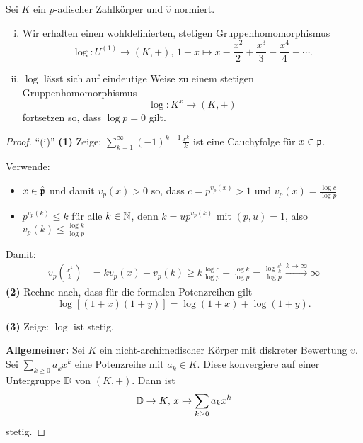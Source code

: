 \begin{Prop}
Sei $K$ ein $p$-adischer Zahlkörper und $\hat{v}$ normiert.
\begin{enumerate}[(i)]
\item Wir erhalten einen wohldefinierten, stetigen Gruppenhomomorphismus
\[ \log \colon U^{(1)} \to (K,+) , \, 1+x \mapsto x - \frac{x^2}{2} + \frac{x^3}{3} - \frac{x^4}{4} + \cdots .
\]
\item $\log$ lässt sich auf eindeutige Weise zu einem stetigen Gruppenhomomorphismus
\[ \log \colon K^x \to (K,+)
\]
fortsetzen so, dass $\log p = 0$ gilt.
\end{enumerate}
\end{Prop}


\begin{proof}
\enquote{(i)} \textbf{(1)} Zeige: $\sum_{k=1}^{\infty} (-1)^{k-1} \frac{x^k}{k}$ ist eine Cauchyfolge für $x\in\mathfrak{p}$.

\bigskip Verwende:
\begin{itemize}
\item $x \in \hat{\mathfrak{p}}$ und damit $v_p(x)>0$ so, dass $c= p^{v_p(x)} >1$ und $v_p(x) = \frac{\log c}{\log p}$
\item $p^{v_p(k)} \leq k$ für alle $k \in \mathbb{N}$, denn $k = u p^{v_p(k)}$ mit $(p,u) = 1$, also
	$v_p(k) \leq \frac{\log k}{\log p}$
\end{itemize}
Damit:
\begin{align*}
v_p \left( \frac{x^k}{k} \right)
&= kv_p(x) - v_p(k)
\geq k \frac{\log c}{\log p} - \frac{\log k}{\log p}
= \frac{\log \frac{c^k}{k}}{\log p}
\xrightarrow{k\to \infty} \infty
\end{align*}
\textbf{(2)} Rechne nach, dass für die formalen Potenzreihen gilt
\[ \log [(1+x)(1+y)] = \log (1+x) + \log (1+y).
\]

\bigskip \textbf{(3)} Zeige: $\log$ ist stetig.

\bigskip \textbf{Allgemeiner:} Sei $K$ ein nicht-archimedischer Körper mit diskreter Bewertung $v$. Sei $\sum_{k \geq 0} a_k x^k$ eine Potenzreihe mit $a_k \in K$. Diese konvergiere auf einer Untergruppe $\mathbb{D}$ von $(K,+)$. Dann ist
\[ \mathbb{D} \to K, \, x \mapsto \sum_{k \geq 0} a_k x^k
\]
stetig.


\end{proof}
